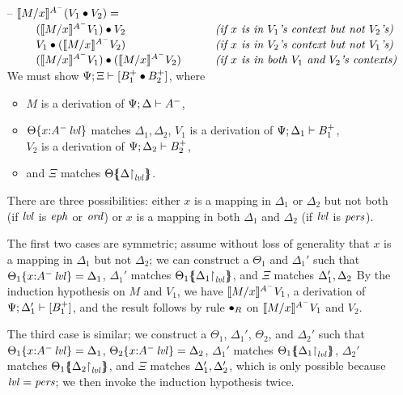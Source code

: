 \begin{itemize}
\item[--] $\rsubsta{M}{x}{(\tfuser{V_1}{V_2})}{A^-} = $ \smallskip\\
    $\begin{array}{ll}
    \qquad \tfuser{(\rsubsta{M}{x}{V_1}{A^-})}{V_2}
     & \mbox{\it (if $x$ is in $V_1$'s context but not $V_2$'s)}\\
    \qquad \tfuser{V_1}{(\rsubsta{M}{x}{V_2}{A^-})}
     & \mbox{\it (if $x$ is in $V_2$'s context but not $V_1$'s)}\\
    \qquad \tfuser{(\rsubsta{M}{x}{V_1}{A^-})}{(\rsubsta{M}{x}{V_2}{A^-})}
     \qquad & \mbox{\it (if $x$ is in both $V_1$ and $V_2$'s contexts)}
    \end{array}$\smallskip\\
  We must show $\foc{\Psi}{\Xi}{[B_1^+ \fuse B_2^+]}$, where 
  \begin{itemize}
  \item $M$ is a derivation of $\foc{\Psi}{\Delta}{A^-}$, 
  \item $\tackon{\Theta}{x{:}\islvl{A^-}}$ matches $\Delta_1, \Delta_2$,
     $V_1$ is a derivation of $\foc{\Psi}{\Delta_1}{B_1^+}$, \\
     $V_2$ is a derivation of $\foc{\Psi}{\Delta_2}{B_2^+}$, 
  \item and $\Xi$ matches $\frameoff{\Theta}{\restrictto{\Delta}{\mlvl}}$.
  \end{itemize}
  There are three possibilities: either $x$ is a mapping in $\Delta_1$
  or $\Delta_2$ but not both (if $\mlvl$ is $\meph$ or $\mtrue$) 
  or $x$ is a mapping in both $\Delta_1$ and $\Delta_2$ (if $\mlvl$ 
  is $\mpers$). 

  The first two cases are symmetric; 
  assume without loss of generality that $x$ is a mapping
  in $\Delta_1$ but not $\Delta_2$; we can construct a 
  $\Theta_1$ and $\Delta_1'$ 
  such that $\tackon{\Theta_1}{x{:}\islvl{A^-}} = \Delta_1$,
  $\Delta_1'$ matches $\frameoff{\Theta_1}{\restrictto{\Delta_1}{\mlvl}}$,
  and $\Xi$ matches $\matchconj{\Delta_1'}{\Delta_2}$
  By the induction hypothesis on $M$ and $V_1$, we have 
  $\rsubsta{M}{x}{V_1}{A^-}$, a derivation of 
  $\foc{\Psi}{\Delta_1'}{[B_1^+]}$, and the result follows by
  rule ${\fuse}_R$ on $\rsubsta{M}{x}{V_1}{A^-}$ and $V_2$.

  The third case is similar; we construct a 
  $\Theta_1$, $\Delta_1'$, $\Theta_2$, and $\Delta_2'$ such that 
  $\tackon{\Theta_1}{x{:}\islvl{A^-}} = \Delta_1$,
  $\tackon{\Theta_2}{x{:}\islvl{A^-}} = \Delta_2$,
  $\Delta_1'$ matches $\frameoff{\Theta_1}{\restrictto{\Delta_1}{\mlvl}}$,
  $\Delta_2'$ matches $\frameoff{\Theta_1}{\restrictto{\Delta_2}{\mlvl}}$,
  and $\Xi$ matches $\matchconj{\Delta_1'}{\Delta_2'}$, which is only 
  possible because $\mlvl = \mpers$; we then invoke the induction 
  hypothesis twice. 


\end{itemize}
